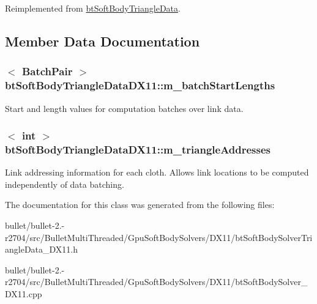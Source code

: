 Reimplemented from \hyperlink{classbt_soft_body_triangle_data}{bt\+Soft\+Body\+Triangle\+Data}.



\subsection{Member Data Documentation}
\hypertarget{classbt_soft_body_triangle_data_d_x11_a656296170e5674fd89683db8c5b0948f}{
\subsubsection[{m\+\_\+batch\+Start\+Lengths}]{$<$ {\bf Batch\+Pair} $>$ bt\+Soft\+Body\+Triangle\+Data\+D\+X11\+::m\+\_\+batch\+Start\+Lengths}}\label{classbt_soft_body_triangle_data_d_x11_a656296170e5674fd89683db8c5b0948f}
Start and length values for computation batches over link data. \hypertarget{classbt_soft_body_triangle_data_d_x11_a265feb3aa3cd4133ae22e94232213420}{
\subsubsection[{m\+\_\+triangle\+Addresses}]{$<$ int $>$ bt\+Soft\+Body\+Triangle\+Data\+D\+X11\+::m\+\_\+triangle\+Addresses}}\label{classbt_soft_body_triangle_data_d_x11_a265feb3aa3cd4133ae22e94232213420}
Link addressing information for each cloth. Allows link locations to be computed independently of data batching. 

The documentation for this class was generated from the following files\+:\begin{DoxyCompactItemize}
\item 
bullet/bullet-\/2.-\/r2704/src/\+Bullet\+Multi\+Threaded/\+Gpu\+Soft\+Body\+Solvers/\+D\+X11/bt\+Soft\+Body\+Solver\+Triangle\+Data\+\_\+\+D\+X11.\+h\item 
bullet/bullet-\/2.-\/r2704/src/\+Bullet\+Multi\+Threaded/\+Gpu\+Soft\+Body\+Solvers/\+D\+X11/bt\+Soft\+Body\+Solver\+\_\+\+D\+X11.\+cpp\end{DoxyCompactItemize}
